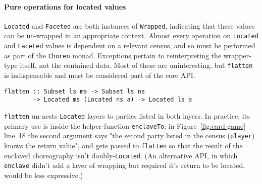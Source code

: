 \documentclass[sigplan,screen,review,anonymous]{acmart}
\newcommand{\inlinecode}[2][haskell]{\texttt{#2}}
\begin{document}
\paragraph{Pure operations for located values}
\inlinecode{Located} and \inlinecode{Faceted} are both instances of \inlinecode{Wrapped},
indicating that these values can be \inlinecode{un}-wrapped in an appropriate context.
Almost every operation on \inlinecode{Located} and \inlinecode{Faceted} values is dependent
on a relevant census, and so must be performed as part of the \inlinecode{Choreo} monad.
Exceptions pertain to reinterpreting the wrapper-type itself, not the contained data.
Most of these are uninteresting,
but \inlinecode{flatten} is indispensable and must be considered part of the core API.
%
\begin{verbatim}
flatten :: Subset ls ms -> Subset ls ns
        -> Located ms (Located ns a) -> Located ls a
\end{verbatim}
%
\inlinecode{flatten} un-nests \inlinecode{Located} layers to parties listed in both layers.
In practice, its primary use is inside the helper-function \inlinecode{enclaveTo};
in Figure~\ref{fig:card-game} line~18 the second argument says
"the second party listed in the census (\inlinecode{player}) knows the return value",
and gets passed to \inlinecode{flatten} so that the result of the enclaved choreography
isn't doubly-\inlinecode{Located}.
(An alternative API, in which \inlinecode{enclave} didn't add a layer of wrapping but
required it's return to be located, would be less expressive.)
\end{document}
